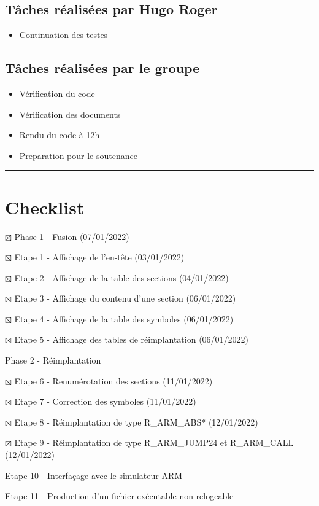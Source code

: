 \documentclass[11pt,letterpaper]{article}
\begin{document}
\subsection*{Tâches réalisées par Hugo Roger}
\begin{itemize}
    \item Continuation des testes
\end{itemize}

\subsection*{Tâches réalisées par le groupe}
\begin{itemize}
    \item Vérification du code
    \item Vérification des documents
    \item Rendu du code à 12h
    \item Preparation pour le soutenance
\end{itemize}

\noindent\rule{13cm}{0.4pt}

\section*{Checklist}
\begin{todolist}
    \item[$\boxtimes$] Phase 1 - Fusion (07/01/2022)
    \begin{todolist}
      \item[$\boxtimes$] Etape 1 - Affichage de l'en-tête  (03/01/2022)
      \item[$\boxtimes$] Etape 2 - Affichage de la table des sections (04/01/2022)
      \item[$\boxtimes$] Etape 3 - Affichage du contenu d'une section (06/01/2022)
      \item[$\boxtimes$] Etape 4 - Affichage de la table des symboles (06/01/2022)
      \item[$\boxtimes$] Etape 5 - Affichage des tables de réimplantation (06/01/2022)
    \end{todolist}
    \item Phase 2 - Réimplantation
    \begin{todolist}
        \item[$\boxtimes$] Etape 6 - Renumérotation des sections (11/01/2022)
        \item[$\boxtimes$] Etape 7 - Correction des symboles (11/01/2022)
        \item[$\boxtimes$] Etape 8 - Réimplantation de type R\_ARM\_ABS* (12/01/2022)
        \item[$\boxtimes$] Etape 9 - Réimplantation de type R\_ARM\_JUMP24 et 
        R\_ARM\_CALL (12/01/2022)
        \item Etape 10 - Interfaçage avec le simulateur ARM 
        \item Etape 11 - Production d'un fichier exécutable non relogeable
      \end{todolist}
  \end{todolist}
\end{document}
